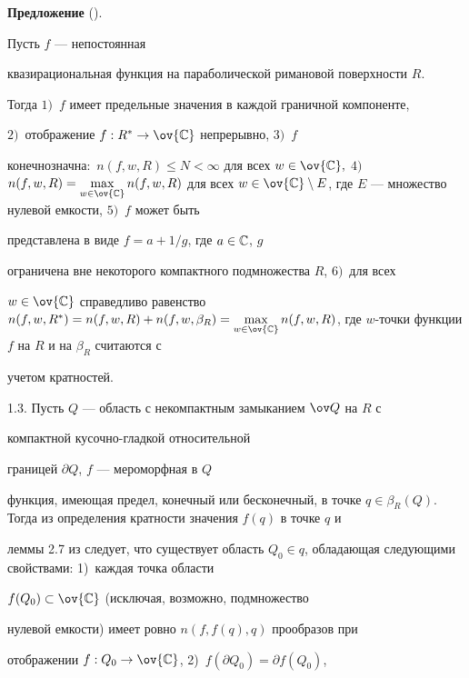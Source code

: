 {\bf Предложение} (\cite{Myr}). {\it


Пусть $f$ --- непостоянная


квазирациональная функция на параболической римановой поверхности $R$.


Тогда $1)$~$f$ имеет предельные значения в каждой граничной компоненте,


$2)$~отображение $f: R^*\to \ov{\Bbb C}$ непрерывно, $3)$~$f$


конечнозначна$:$ $n(f, w, R)\le N<\infty$ для всех $w\in


\ov{\Bbb C},$ $4)$~$n(f, w, R)=\max\limits_{w\in


\ov{\Bbb C}}n(f, w, R)$ для всех $w\in \ov{\Bbb


C}\setminus E$, где $E$ --- множество нулевой емкости, $5)$~$f$ может быть


представлена в виде $f=a+1/g$, где $a\in \Bbb C$, $g$


ограничена вне некоторого компактного подмножества $R$, $6)$~для всех


$w\in \ov{\Bbb C}$ справедливо равенство $n(f, w, R^*)=n(f,


w, R)+n(f, w, \beta_R)=\max\limits_{w\in \ov{\Bbb C}} n(f,


w, R)$, где $w$-точки функции $f$ на $R$ и на $\beta_R$ считаются с


учетом кратностей.


}


\medskip





1.3. Пусть $Q$ --- область с некомпактным замыканием $\ov Q$ на $R$ с


компактной кусочно-гладкой относительной


границей $\partial Q$, $f$ --- мероморфная в $Q$


функция, имеющая предел, конечный или бесконечный, в точке $q\in


\beta_R(Q)$. Тогда из определения кратности значения $f(q)$ в точке $q$ и


леммы 2.7 из \cite{Myr} следует, что существует область $Q_0\in


q$, обладающая следующими свойствами: 1)~каждая точка области


$f(Q_0)\subset \ov{\Bbb C}$ (исключая, возможно, подмножество


нулевой емкости) имеет ровно $n(f, f(q), q)$ прообразов при


отображении $f: Q_0\to \ov{\Bbb C}$, 2)~$f(\partial Q_0)=\partial f(Q_0)$,


